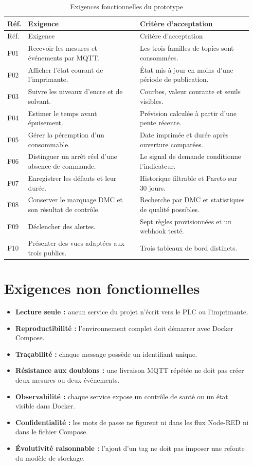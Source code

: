 \begin{longtable}{p{}p{}p{}}
\caption{Exigences fonctionnelles du prototype}\\
\toprule
Réf. & Exigence & Critère d'acceptation \\
\midrule
\endfirsthead
\toprule
Réf. & Exigence & Critère d'acceptation \\
\midrule
\endhead
F01 & Recevoir les mesures et événements par MQTT. &
Les trois familles de topics sont consommées. \\
F02 & Afficher l'état courant de l'imprimante. &
État mis à jour en moins d'une période de publication. \\
F03 & Suivre les niveaux d'encre et de solvant. &
Courbes, valeur courante et seuils visibles. \\
F04 & Estimer le temps avant épuisement. &
Prévision calculée à partir d'une pente récente. \\
F05 & Gérer la péremption d'un consommable. &
Date imprimée et durée après ouverture comparées. \\
F06 & Distinguer un arrêt réel d'une absence de commande. &
Le signal de demande conditionne l'indicateur. \\
F07 & Enregistrer les défauts et leur durée. &
Historique filtrable et Pareto sur 30 jours. \\
F08 & Conserver le marquage DMC et son résultat de contrôle. &
Recherche par DMC et statistiques de qualité possibles. \\
F09 & Déclencher des alertes. &
Sept règles provisionnées et un webhook testé. \\
F10 & Présenter des vues adaptées aux trois publics. &
Trois tableaux de bord distincts. \\
\bottomrule
\end{longtable}

\section{Exigences non fonctionnelles}

\begin{itemize}
  \item \textbf{Lecture seule :} aucun service du projet n'écrit vers le PLC ou
        l'imprimante.
  \item \textbf{Reproductibilité :} l'environnement complet doit démarrer avec
        Docker Compose.
  \item \textbf{Traçabilité :} chaque message possède un identifiant unique.
  \item \textbf{Résistance aux doublons :} une livraison MQTT répétée ne doit
        pas créer deux mesures ou deux événements.
  \item \textbf{Observabilité :} chaque service expose un contrôle de santé ou
        un état visible dans Docker.
  \item \textbf{Confidentialité :} les mots de passe ne figurent ni dans les
        flux Node-RED ni dans le fichier Compose.
  \item \textbf{Évolutivité raisonnable :} l'ajout d'un tag ne doit pas imposer
        une refonte du modèle de stockage.
\end{itemize}

